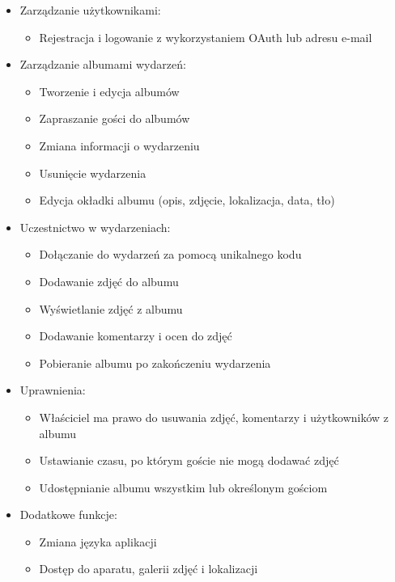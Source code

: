 \begin{itemize}

    \item Zarządzanie użytkownikami:
          \begin{itemize}
              \item Rejestracja i logowanie z wykorzystaniem OAuth lub adresu \linebreak e-mail
          \end{itemize}

    \item Zarządzanie albumami wydarzeń:
          \begin{itemize}
              \item Tworzenie i edycja albumów
              \item Zapraszanie gości do albumów
              \item Zmiana informacji o wydarzeniu
              \item Usunięcie wydarzenia
              \item Edycja okładki albumu (opis, zdjęcie, lokalizacja, data, tło)
          \end{itemize}

    \item Uczestnictwo w wydarzeniach:
          \begin{itemize}
              \item Dołączanie do wydarzeń za pomocą unikalnego kodu
              \item Dodawanie zdjęć do albumu
              \item Wyświetlanie zdjęć z albumu
              \item Dodawanie komentarzy i ocen do zdjęć
              \item Pobieranie albumu po zakończeniu wydarzenia
          \end{itemize}
          \newpage
    \item Uprawnienia:
          \begin{itemize}
              \item Właściciel ma prawo do usuwania zdjęć, komentarzy i użytkowników z albumu
              \item Ustawianie czasu, po którym goście nie mogą dodawać zdjęć
              \item Udostępnianie albumu wszystkim lub określonym gościom
          \end{itemize}
    \item Dodatkowe funkcje:
          \begin{itemize}
              \item Zmiana języka aplikacji
              \item Dostęp do aparatu, galerii zdjęć i lokalizacji
          \end{itemize}
\end{itemize}

